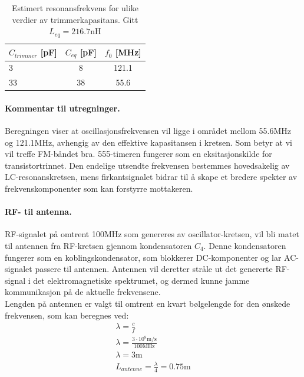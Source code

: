 \begin{table}[H]
\centering
\caption{Estimert resonansfrekvens for ulike verdier av trimmerkapasitans. Gitt $L_{eq} = 216.7\text{nH}$}
\label{tab:resonansfrekvens}
\begin{tabular}{lcc}
\toprule
\textbf{$C_{trimmer}$ [pF]} & \textbf{$C_{eq}$ [pF]} & \textbf{$f_0$ [MHz]} \\
\midrule

3  & 8  & 121.1 \\
33 & 38 & 55.6 \\

\bottomrule
\end{tabular}
\end{table}

\paragraph{Kommentar til utregninger. } Beregningen viser at oscillasjonsfrekvensen vil ligge i området mellom 55.6MHz og 121.1MHz, avhengig av den effektive kapasitansen i kretsen. Som betyr at vi vil treffe FM-båndet bra. 555-timeren fungerer som en eksitasjonskilde for transistortrinnet. Den endelige utsendte frekvensen bestemmes hovedsakelig av LC-resonanskretsen, mens firkantsignalet bidrar til å skape et bredere spekter av frekvenskomponenter som kan forstyrre mottakeren.

\paragraph{RF- til antenna. } RF-signalet på omtrent 100MHz som genereres av oscillator-kretsen, vil bli matet til antennen fra RF-kretsen gjennom kondensatoren $C_4$. Denne kondensatoren fungerer som en koblingskondensator, som blokkerer DC-komponenter og lar AC-signalet passere til antennen. Antennen vil deretter stråle ut det genererte RF-signal i det elektromagnetiske spektrumet, og dermed kunne jamme kommunikasjon på de aktuelle frekvensene.
\\[1em]
Lengden på antennen er valgt til omtrent en kvart bølgelengde for den ønskede frekvensen, som kan beregnes ved:
\begin{gather*}
    \lambda = \frac{c}{f} \\
    \lambda = \frac{3 \cdot 10^8\text{m/s}}{100\text{MHz}} \\
    \lambda = 3\text{m} \\
    L_{antenne} = \frac{\lambda}{4} = 0.75\text{m}
\end{gather*}